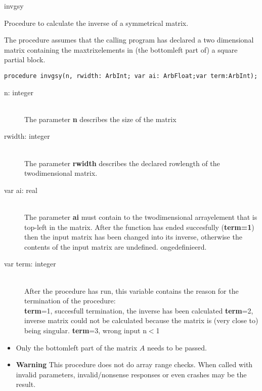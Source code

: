 \documentclass{report}
\newcommand{\FunctionDescription}{\item[Description]\rmfamily}
\newcommand{\Dataorganisation}{\item[Data Struct]\rmfamily}
\newcommand{\DeclarationandParams}{\item[Declaration]\rmfamily}
\newcommand{\Remarks}{\item[Remarks]\rmfamily}
\begin{document}
\begin{procedure}{invgsy}

\FunctionDescription

Procedure to calculate the inverse of a symmetrical matrix.

\Dataorganisation

The procedure assumes that the calling program has declared a two
dimensional matrix containing the maxtrixelements in (the bottomleft part
of) a square partial block.

\DeclarationandParams

\lstinline|procedure invgsy(n, rwidth: ArbInt; var ai: ArbFloat;var term:ArbInt);|

\begin{description}
 \item[n: integer] \mbox{ } \\
    The parameter {\bf n} describes the size of the matrix
 \item[rwidth: integer] \mbox{} \\
    The parameter {\bf rwidth} describes the declared rowlength of the twodimensional
    matrix.
 \item[var ai: real] \mbox{} \\
    The parameter {\bf ai} must contain to the twodimensional arrayelement
    that is top-left in the matrix.
    After the function has ended succesfully (\textbf{term=1}) then
    the input matrix has been changed into its inverse, otherwise the contents
    of the input matrix are undefined.
    ongedefinieerd.
 \item[var term: integer]  \mbox{} \\
    After the procedure has run, this variable contains the reason for
    the termination of the procedure:\\
      {\bf term}=1, succesfull termination, the inverse has been calculated
      {\bf term}=2, inverse matrix could not be calculated because the matrix
                    is (very close to) being singular.
      {\bf term}=3, wrong input n$<$1

\end{description}

\Remarks
\begin{itemize}
\item Only the bottomleft part of the matrix $A$ needs to be passed.
\item \textbf{Warning} This procedure does not do array range checks. When called with invalid
parameters, invalid/nonsense responses or even crashes may be the result.
\end{itemize}


\end{procedure}
\end{document}
